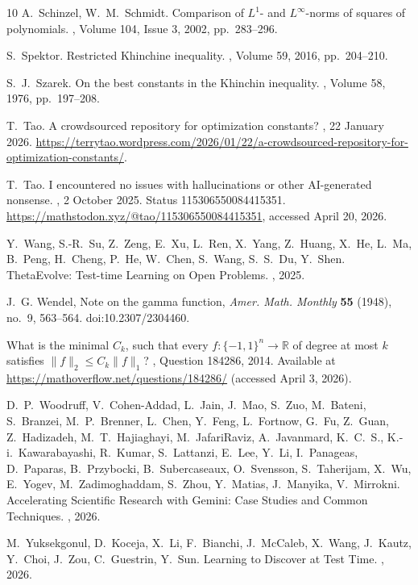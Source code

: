 \documentclass[11pt]{article}
\begin{document}
\begin{thebibliography}{10}
A.~Schinzel, W.~M.~Schmidt.
\newblock Comparison of \(L^1\)- and \(L^\infty\)-norms of squares of polynomials.
, Volume 104, Issue 3,
2002, pp.~283--296.

S.~Spektor.
\newblock Restricted Khinchine inequality.
, Volume 59,
2016, pp.~204--210.

S.~J.~Szarek.
\newblock On the best constants in the Khinchin inequality.
, Volume 58,
1976, pp.~197--208.

T.~Tao.
\newblock A crowdsourced repository for optimization constants?
,
22 January 2026.
\newblock \url{https://terrytao.wordpress.com/2026/01/22/a-crowdsourced-repository-for-optimization-constants/}.

T.~Tao.
\newblock I encountered no issues with hallucinations or other AI-generated nonsense.
,
2 October 2025.
\newblock Status 115306550084415351.
\newblock \url{https://mathstodon.xyz/@tao/115306550084415351},
accessed April 20, 2026.

Y.~Wang, S.-R.~Su, Z.~Zeng, E.~Xu, L.~Ren, X.~Yang, Z.~Huang, X.~He,
L.~Ma, B.~Peng, H.~Cheng, P.~He, W.~Chen, S.~Wang, S.~S.~Du, Y.~Shen.
\newblock ThetaEvolve: Test-time Learning on Open Problems.
,
2025.

J.~G. Wendel,
\newblock Note on the gamma function,
\newblock \emph{Amer. Math. Monthly} \textbf{55} (1948), no.~9, 563--564.
\newblock doi:10.2307/2304460.

\newblock What is the minimal \(C_k\), such that every \(f\colon\{-1,1\}^n\to\mathbb{R}\) of degree at most \(k\) satisfies \(\|f\|_2\le C_k\|f\|_1\)?
, Question 184286, 2014.
\newblock Available at \url{https://mathoverflow.net/questions/184286/} (accessed April 3, 2026).

D.~P.~Woodruff, V.~Cohen-Addad, L.~Jain, J.~Mao, S.~Zuo, M.~Bateni,
S.~Branzei, M.~P.~Brenner, L.~Chen, Y.~Feng, L.~Fortnow, G.~Fu, Z.~Guan,
Z.~Hadizadeh, M.~T.~Hajiaghayi, M.~JafariRaviz, A.~Javanmard, K.~C.~S.,
K.-i.~Kawarabayashi, R.~Kumar, S.~Lattanzi, E.~Lee, Y.~Li, I.~Panageas,
D.~Paparas, B.~Przybocki, B.~Subercaseaux, O.~Svensson, S.~Taherijam,
X.~Wu, E.~Yogev, M.~Zadimoghaddam, S.~Zhou, Y.~Matias, J.~Manyika,
V.~Mirrokni.
\newblock Accelerating Scientific Research with Gemini: Case Studies and Common Techniques.
,
2026.

M.~Yuksekgonul, D.~Koceja, X.~Li, F.~Bianchi, J.~McCaleb, X.~Wang,
J.~Kautz, Y.~Choi, J.~Zou, C.~Guestrin, Y.~Sun.
\newblock Learning to Discover at Test Time.
,
2026.
\end{thebibliography}
\end{document}
